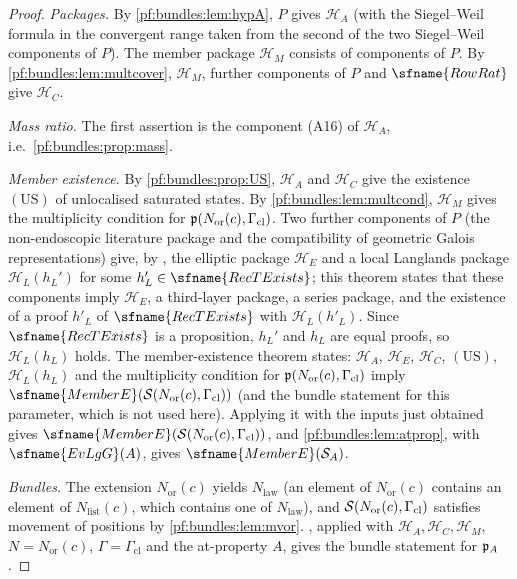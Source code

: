 \begin{proof}
\emph{Packages.} By \cref{pf:bundles:lem:hypA}, $P$ gives $\mathcal H_A$ (with the Siegel--Weil formula in the convergent range taken from the
second of the two Siegel--Weil components of $P$). The member package $\mathcal H_M$ consists of components of $P$. By
\cref{pf:bundles:lem:multcover}, $\mathcal H_M$, further components of $P$ and $\sfname{RowRat}$ give $\mathcal H_C$.

\emph{Mass ratio.} The first assertion is the component (A16) of $\mathcal H_A$, i.e.\ \cref{pf:bundles:prop:mass}.

\emph{Member existence.} By \cref{pf:bundles:prop:US}, $\mathcal H_A$ and $\mathcal H_C$ give the existence $(\mathrm{US})$ of unlocalised saturated
states. By \cref{pf:bundles:lem:multcond}, $\mathcal H_M$ gives the multiplicity condition for $\mathfrak p(N_{\mathrm{or}}(c),\Gamma_{\mathrm{cl}})$. Two
further components of $P$ (the non-endoscopic literature package and the compatibility of geometric Galois representations) give, by
, the elliptic package $\mathcal H_E$ and a local Langlands package
$\mathcal H_L(h_L')$ for some $h_L'\in\sfname{RecTExists}$; this theorem states that these components imply $\mathcal H_E$, a third-layer package, a
series package, and the existence of a proof $h'_L$ of $\sfname{RecTExists}$ with $\mathcal H_L(h'_L)$. Since $\sfname{RecTExists}$ is a proposition,
$h_L'$ and $h_L$ are equal proofs, so $\mathcal H_L(h_L)$ holds. The member-existence theorem
 states: $\mathcal H_A$, $\mathcal H_E$, $\mathcal H_C$, $(\mathrm{US})$, $\mathcal
H_L(h_L)$ and the multiplicity condition for $\mathfrak p(N_{\mathrm{or}}(c),\Gamma_{\mathrm{cl}})$ imply $\sfname{MemberE}(\bundS(N_{\mathrm{or}}(c),
\Gamma_{\mathrm{cl}}))$ (and the bundle statement for this parameter, which is not used here). Applying it with the inputs just obtained gives
$\sfname{MemberE}(\bundS(N_{\mathrm{or}}(c),\Gamma_{\mathrm{cl}}))$, and \cref{pf:bundles:lem:atprop}, with $\sfname{EvLgG}(A)$, gives
$\sfname{MemberE}(\bundS_A)$.

\emph{Bundles.} The extension $N_{\mathrm{or}}(c)$ yields $N_{\mathrm{law}}$ (an element of $N_{\mathrm{or}}(c)$ contains an element of
$N_{\mathrm{list}}(c)$, which contains one of $N_{\mathrm{law}}$), and $\mathcal S(N_{\mathrm{or}}(c),\Gamma_{\mathrm{cl}})$ satisfies movement of positions
by \cref{pf:bundles:lem:mvor}. , applied with $\mathcal H_A,\mathcal H_C,\mathcal H_M$, $N=N_{\mathrm{or}}(c)$,
$\Gamma=\Gamma_{\mathrm{cl}}$ and the at-property $A$, gives the bundle statement for $\mathfrak p_A$.
\end{proof}


